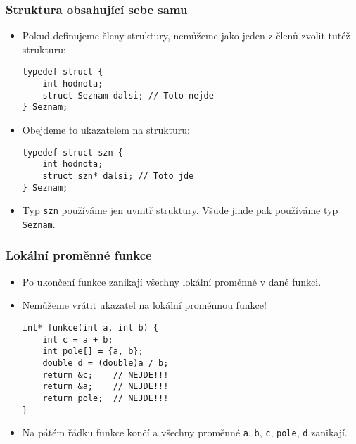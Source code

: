 \documentclass{beamer}
\newenvironment{itemizex}%
  {\large \begin{itemize}%
    \setlength{\itemsep}{8pt}%
    \setlength{\parskip}{8pt}}%
  {\end{itemize}}
\begin{document}
\begin{frame}[t,fragile]\frametitle{Struktura obsahující sebe samu} 
    \begin{itemize}
        \item Pokud definujeme členy struktury, nemůžeme jako jeden z členů zvolit tutéž strukturu:
        \begin{verbatim} 
typedef struct {
    int hodnota;
    struct Seznam dalsi; // Toto nejde
} Seznam;
        \end{verbatim}
        \item Obejdeme to ukazatelem na strukturu:
        \begin{verbatim} 
typedef struct szn {
    int hodnota;
    struct szn* dalsi; // Toto jde
} Seznam;
        \end{verbatim}
        \item Typ \texttt{szn} používáme jen uvnitř struktury. Všude jinde pak používáme typ \texttt{Seznam}.
    \end{itemize}
\end{frame}



\begin{frame}[t,fragile]\frametitle{Lokální proměnné funkce} 
    \begin{itemize}
        \item Po ukončení funkce zanikají všechny lokální proměnné v dané funkci.
        \item Nemůžeme vrátit ukazatel na lokální proměnnou funkce!
        \begin{verbatim} 
int* funkce(int a, int b) {
    int c = a + b;
    int pole[] = {a, b};
    double d = (double)a / b;
    return &c;    // NEJDE!!!
    return &a;    // NEJDE!!!
    return pole;  // NEJDE!!!
}
        \end{verbatim}
        \item Na pátém řádku funkce končí a všechny proměnné \texttt{a}, \texttt{b}, \texttt{c}, \texttt{pole}, \texttt{d} zanikají.
    \end{itemize}
\end{frame}


\end{document}

